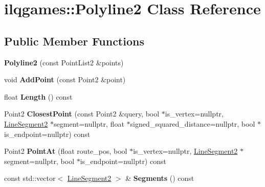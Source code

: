\hypertarget{classilqgames_1_1_polyline2}{}\section{ilqgames\+:\+:Polyline2 Class Reference}
\label{classilqgames_1_1_polyline2}
\subsection*{Public Member Functions}
\begin{DoxyCompactItemize}
\item 
{\bfseries Polyline2} (const Point\+List2 \&points)\hypertarget{classilqgames_1_1_polyline2_a7ea13438c7c3a9b9501311684d797055}{}\label{classilqgames_1_1_polyline2_a7ea13438c7c3a9b9501311684d797055}

\item 
void {\bfseries Add\+Point} (const Point2 \&point)\hypertarget{classilqgames_1_1_polyline2_af8accf55b36d8aaa7c1ba77f4223b7f4}{}\label{classilqgames_1_1_polyline2_af8accf55b36d8aaa7c1ba77f4223b7f4}

\item 
float {\bfseries Length} () const \hypertarget{classilqgames_1_1_polyline2_ad775da2cbcd5c0c2bcc56109b6b4925e}{}\label{classilqgames_1_1_polyline2_ad775da2cbcd5c0c2bcc56109b6b4925e}

\item 
Point2 {\bfseries Closest\+Point} (const Point2 \&query, bool $\ast$is\+\_\+vertex=nullptr, \hyperlink{classilqgames_1_1_line_segment2}{Line\+Segment2} $\ast$segment=nullptr, float $\ast$signed\+\_\+squared\+\_\+distance=nullptr, bool $\ast$is\+\_\+endpoint=nullptr) const \hypertarget{classilqgames_1_1_polyline2_adbd12b8e9e9649b5ad81a84cc7069185}{}\label{classilqgames_1_1_polyline2_adbd12b8e9e9649b5ad81a84cc7069185}

\item 
Point2 {\bfseries Point\+At} (float route\+\_\+pos, bool $\ast$is\+\_\+vertex=nullptr, \hyperlink{classilqgames_1_1_line_segment2}{Line\+Segment2} $\ast$segment=nullptr, bool $\ast$is\+\_\+endpoint=nullptr) const \hypertarget{classilqgames_1_1_polyline2_a6446ad1ee2da0167046af97f620ffe57}{}\label{classilqgames_1_1_polyline2_a6446ad1ee2da0167046af97f620ffe57}

\item 
const std\+::vector$<$ \hyperlink{classilqgames_1_1_line_segment2}{Line\+Segment2} $>$ \& {\bfseries Segments} () const \hypertarget{classilqgames_1_1_polyline2_a7b840910feca7a921e29b919bb884e42}{}\label{classilqgames_1_1_polyline2_a7b840910feca7a921e29b919bb884e42}

\end{DoxyCompactItemize}


